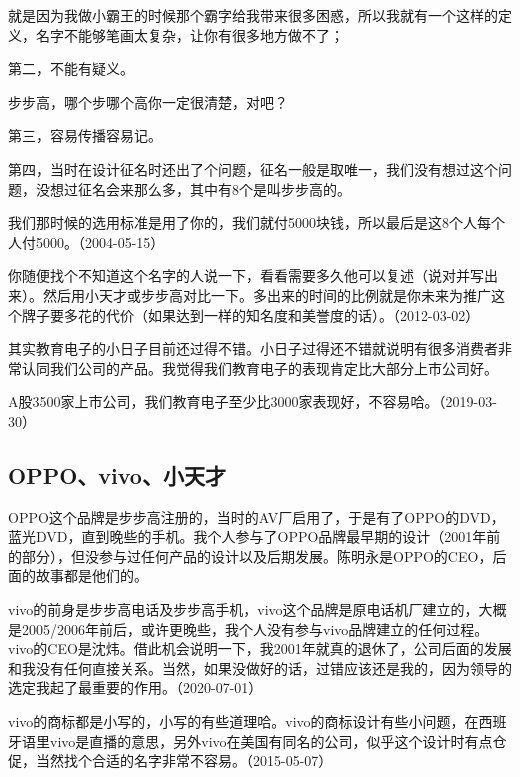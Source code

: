 就是因为我做小霸王的时候那个霸字给我带来很多困惑，所以我就有一个这样的定义，名字不能够笔画太复杂，让你有很多地方做不了；

第二，不能有疑义。

步步高，哪个步哪个高你一定很清楚，对吧？

第三，容易传播容易记。

第四，当时在设计征名时还出了个问题，征名一般是取唯一，我们没有想过这个问题，没想过征名会来那么多，其中有8个是叫步步高的。

我们那时候的选用标准是用了你的，我们就付5000块钱，所以最后是这8个人每个人付5000。（2004-05-15）


你随便找个不知道这个名字的人说一下，看看需要多久他可以复述（说对并写出来）。然后用小天才或步步高对比一下。多出来的时间的比例就是你未来为推广这个牌子要多花的代价（如果达到一样的知名度和美誉度的话）。（2012-03-02）


其实教育电子的小日子目前还过得不错。小日子过得还不错就说明有很多消费者非常认同我们公司的产品。我觉得我们教育电子的表现肯定比大部分上市公司好。

A股3500家上市公司，我们教育电子至少比3000家表现好，不容易哈。（2019-03-30）

\subsection{OPPO、vivo、小天才}

OPPO这个品牌是步步高注册的，当时的AV厂启用了，于是有了OPPO的DVD，蓝光DVD，直到晚些的手机。我个人参与了OPPO品牌最早期的设计（2001年前的部分），但没参与过任何产品的设计以及后期发展。陈明永是OPPO的CEO，后面的故事都是他们的。

vivo的前身是步步高电话及步步高手机，vivo这个品牌是原电话机厂建立的，大概是2005/2006年前后，或许更晚些，我个人没有参与vivo品牌建立的任何过程。vivo的CEO是沈炜。借此机会说明一下，我2001年就真的退休了，公司后面的发展和我没有任何直接关系。当然，如果没做好的话，过错应该还是我的，因为领导的选定我起了最重要的作用。（2020-07-01）

vivo的商标都是小写的，小写的有些道理哈。vivo的商标设计有些小问题，在西班牙语里vivo是直播的意思，另外vivo在美国有同名的公司，似乎这个设计时有点仓促，当然找个合适的名字非常不容易。（2015-05-07）


